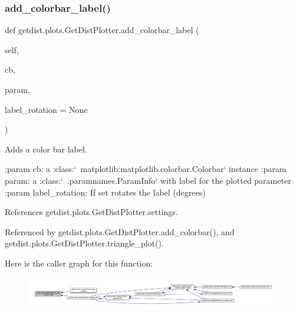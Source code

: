 \subsubsection{\texorpdfstring{add\+\_\+colorbar\+\_\+label()}{add\_colorbar\_label()}}
{\footnotesize\ttfamily def getdist.\+plots.\+Get\+Dist\+Plotter.\+add\+\_\+colorbar\+\_\+label (\begin{DoxyParamCaption}\item[{}]{self,  }\item[{}]{cb,  }\item[{}]{param,  }\item[{}]{label\+\_\+rotation = {\ttfamily None} }\end{DoxyParamCaption})}

\begin{DoxyVerb}Adds a color bar label.

:param cb: a :class:`~matplotlib:matplotlib.colorbar.Colorbar` instance
:param param: a :class:`~.paramnames.ParamInfo` with label for the plotted parameter
:param label_rotation: If set rotates the label (degrees)
\end{DoxyVerb}
 

References getdist.\+plots.\+Get\+Dist\+Plotter.\+settings.



Referenced by getdist.\+plots.\+Get\+Dist\+Plotter.\+add\+\_\+colorbar(), and getdist.\+plots.\+Get\+Dist\+Plotter.\+triangle\+\_\+plot().

Here is the caller graph for this function\+:
\nopagebreak
\begin{figure}[H]
\begin{center}
\leavevmode
\includegraphics[width=350pt]{classgetdist_1_1plots_1_1GetDistPlotter_ae418e1e11ac0e54cec213eb7b1e8cec9_icgraph}
\end{center}
\end{figure}
\mbox{\label{classgetdist_1_1plots_1_1GetDistPlotter_ac9e49994c54fdfa9120acddc2c19c352}} 

